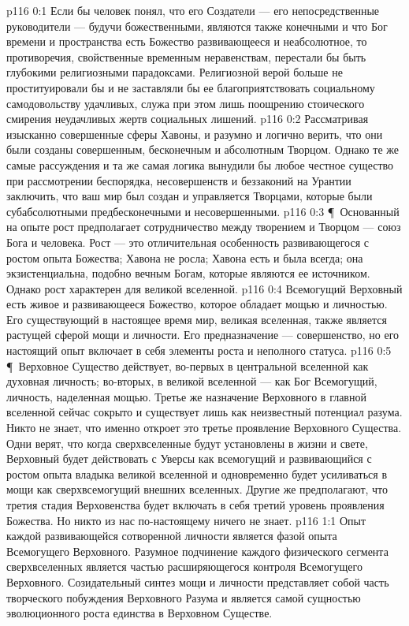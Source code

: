 \vs p116 0:1 Если бы человек понял, что его Создатели --- его непосредственные руководители --- будучи божественными, являются также конечными и что Бог времени и пространства есть Божество развивающееся и неабсолютное, то противоречия, свойственные временным неравенствам, перестали бы быть глубокими религиозными парадоксами. Религиозной верой больше не проституировали бы и не заставляли бы ее благоприятствовать социальному самодовольству удачливых, служа при этом лишь поощрению стоического смирения неудачливых жертв социальных лишений.
\vs p116 0:2 Рассматривая изысканно совершенные сферы Хавоны, и разумно и логично верить, что они были созданы совершенным, бесконечным и абсолютным Творцом. Однако те же самые рассуждения и та же самая логика вынудили бы любое честное существо при рассмотрении беспорядка, несовершенств и беззаконий на Урантии заключить, что ваш мир был создан и управляется Творцами, которые были субабсолютными предбесконечными и несовершенными.
\vs p116 0:3 \P\ Основанный на опыте рост предполагает сотрудничество между творением и Творцом --- союз Бога и человека. Рост --- это отличительная особенность развивающегося с ростом опыта Божества; Хавона не росла; Хавона есть и была всегда; она экзистенциальна, подобно вечным Богам, которые являются ее источником. Однако рост характерен для великой вселенной.
\vs p116 0:4 Всемогущий Верховный есть живое и развивающееся Божество, которое обладает мощью и личностью. Его существующий в настоящее время мир, великая вселенная, также является растущей сферой мощи и личности. Его предназначение --- совершенство, но его настоящий опыт включает в себя элементы роста и неполного статуса.
\vs p116 0:5 \P\ Верховное Существо действует, во\hyp{}первых в центральной вселенной как духовная личность; во\hyp{}вторых, в великой вселенной --- как Бог Всемогущий, личность, наделенная мощью. Третье же назначение Верховного в главной вселенной сейчас сокрыто и существует лишь как неизвестный потенциал разума. Никто не знает, что именно откроет это третье проявление Верховного Существа. Одни верят, что когда сверхвселенные будут установлены в жизни и свете, Верховный будет действовать с Уверсы как всемогущий и развивающийся с ростом опыта владыка великой вселенной и одновременно будет усиливаться в мощи как сверхвсемогущий внешних вселенных. Другие же предполагают, что третия стадия Верховенства будет включать в себя третий уровень проявления Божества. Но никто из нас по\hyp{}настоящему ничего не знает.
\vs p116 1:1 Опыт каждой развивающейся сотворенной личности является фазой опыта Всемогущего Верховного. Разумное подчинение каждого физического сегмента сверхвселенных является частью расширяющегося контроля Всемогущего Верховного. Созидательный синтез мощи и личности представляет собой часть творческого побуждения Верховного Разума и является самой сущностью эволюционного роста единства в Верховном Существе.
